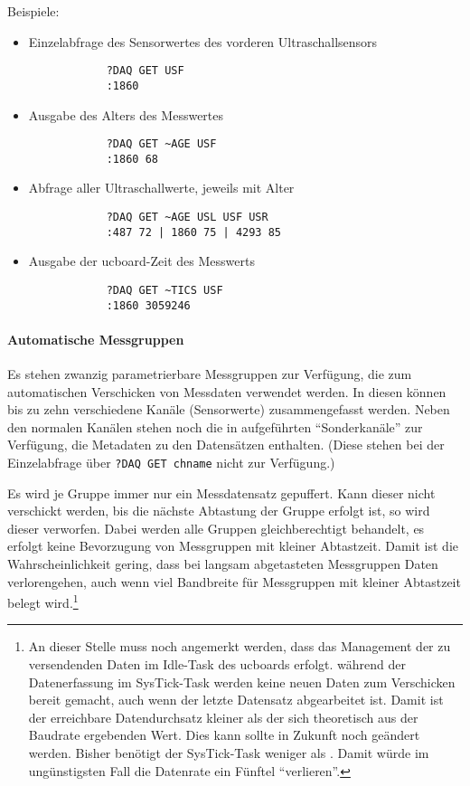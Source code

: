 Beispiele:

\begin{itemize}
	\item Einzelabfrage des Sensorwertes des vorderen Ultraschallsensors
		\begin{verbatim}
			?DAQ GET USF
			:1860
		\end{verbatim}
	\item Ausgabe des Alters des Messwertes
		\begin{verbatim}
			?DAQ GET ~AGE USF
			:1860 68
		\end{verbatim}
	\item Abfrage aller Ultraschallwerte, jeweils mit Alter
		\begin{verbatim}
			?DAQ GET ~AGE USL USF USR
			:487 72 | 1860 75 | 4293 85
		\end{verbatim}
	\item Ausgabe der ucboard-Zeit des Messwerts
		\begin{verbatim}
			?DAQ GET ~TICS USF
			:1860 3059246
		\end{verbatim}
\end{itemize}
















\paragraph{Automatische Messgruppen}

Es stehen zwanzig parametrierbare Messgruppen zur Verfügung, die zum automatischen Verschicken von Messdaten verwendet werden. In diesen können bis zu zehn verschiedene Kanäle (Sensorwerte) zusammengefasst werden. Neben den normalen Kanälen stehen noch die in  aufgeführten "`Sonderkanäle"' zur Verfügung, die Metadaten zu den Datensätzen enthalten. (Diese stehen bei der Einzelabfrage über \verb|?DAQ GET chname| nicht zur Verfügung.)

Es wird je Gruppe immer nur ein Messdatensatz gepuffert. Kann dieser nicht verschickt werden, bis die nächste Abtastung der Gruppe erfolgt ist, so wird dieser verworfen. Dabei werden alle Gruppen gleichberechtigt behandelt, \dah es erfolgt keine Bevorzugung von Messgruppen mit kleiner Abtastzeit. Damit ist die Wahrscheinlichkeit gering, dass bei langsam abgetasteten Messgruppen Daten verlorengehen, auch wenn viel Bandbreite für Messgruppen mit kleiner Abtastzeit belegt wird.\footnote{An dieser Stelle muss noch angemerkt werden, dass das Management der zu versendenden Daten im Idle-Task des ucboards erfolgt. \Dah während der Datenerfassung im SysTick-Task werden keine neuen Daten zum Verschicken bereit gemacht, auch wenn der letzte Datensatz abgearbeitet ist. Damit ist der erreichbare Datendurchsatz kleiner als der sich theoretisch aus der Baudrate ergebenden Wert. Dies kann \bzw sollte in Zukunft noch geändert werden. Bisher benötigt der SysTick-Task weniger als . Damit würde im ungünstigsten Fall die Datenrate ein Fünftel "`verlieren"'.}

